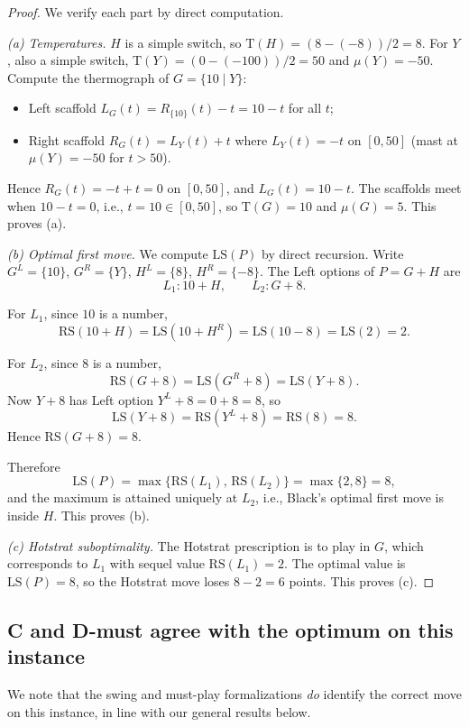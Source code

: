 \documentclass[11pt,a4paper]{amsart}
\theoremstyle{definition}
\theoremstyle{remark}
\newcommand{\LS}{\mathrm{LS}}
\newcommand{\RS}{\mathrm{RS}}
\newcommand{\Tt}{\mathrm{T}}
\begin{document}
\begin{proof}
We verify each part by direct computation.

\smallskip\noindent\emph{(a) Temperatures.}
$H$ is a simple switch, so $\Tt(H) = (8-(-8))/2 = 8$. For $Y$, also a
simple switch, $\Tt(Y) = (0 - (-100))/2 = 50$ and $\mu(Y) = -50$.
Compute the thermograph of $G = \{10 \mid Y\}$:
\begin{itemize}[leftmargin=2em]
\item Left scaffold $L_G(t) = R_{\{10\}}(t) - t = 10 - t$ for all $t$;
\item Right scaffold $R_G(t) = L_Y(t) + t$ where $L_Y(t) = -t$ on
  $[0, 50]$ (mast at $\mu(Y) = -50$ for $t > 50$).
\end{itemize}
Hence $R_G(t) = -t + t = 0$ on $[0, 50]$, and $L_G(t) = 10 - t$. The
scaffolds meet when $10 - t = 0$, i.e., $t = 10 \in [0, 50]$, so
$\Tt(G) = 10$ and $\mu(G) = 5$. This proves (a).

\smallskip\noindent\emph{(b) Optimal first move.}
We compute $\LS(P)$ by direct recursion. Write $G^L = \{10\}$,
$G^R = \{Y\}$, $H^L = \{8\}$, $H^R = \{-8\}$. The Left options of
$P = G + H$ are
\[
  L_1: 10 + H, \qquad L_2: G + 8.
\]

For $L_1$, since $10$ is a number,
\[
  \RS(10 + H) = \LS(10 + H^R) = \LS(10 - 8) = \LS(2) = 2.
\]

For $L_2$, since $8$ is a number,
\[
  \RS(G + 8) = \LS(G^R + 8) = \LS(Y + 8).
\]
Now $Y + 8$ has Left option $Y^L + 8 = 0 + 8 = 8$, so
\[
  \LS(Y + 8) = \RS(Y^L + 8) = \RS(8) = 8.
\]
Hence $\RS(G + 8) = 8$.

Therefore
\[
  \LS(P) = \max\{\RS(L_1),\, \RS(L_2)\} = \max\{2, 8\} = 8,
\]
and the maximum is attained uniquely at $L_2$, i.e., Black's optimal
first move is inside $H$. This proves (b).

\smallskip\noindent\emph{(c) Hotstrat suboptimality.}
The Hotstrat prescription is to play in $G$, which corresponds to $L_1$
with sequel value $\RS(L_1) = 2$. The optimal value is $\LS(P) = 8$, so
the Hotstrat move loses $8 - 2 = 6$ points. This proves (c).
\end{proof}

\subsection{C and D-must agree with the optimum on this instance}

We note that the swing and must-play formalizations \emph{do} identify the
correct move on this instance, in line with our general results below.
\end{document}
